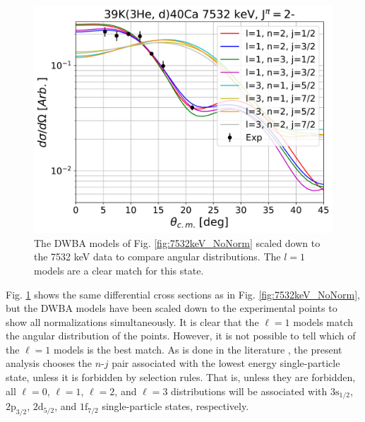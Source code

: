 \begin{figure}[t]
\centering
\includegraphics[width=6.5in]{Chapter-6/figs/7532keV_Norm.png}
\caption{\label{fig:7532keV_Norm}The DWBA models of Fig. \ref{fig:7532keV_NoNorm} scaled down to the 7532 keV data to compare angular distributions. The $l=1$ models are a clear match for this state.}
\end{figure}

Fig. \ref{fig:7532keV_Norm} shows the same differential cross sections as in Fig. \ref{fig:7532keV_NoNorm}, but the DWBA models have been scaled down to the experimental points to show all normalizations simultaneously. It is clear that the $\ell=1$ models match the angular distribution of the points. However, it is not possible to tell which of the $\ell=1$ models is the best match. As is done in the literature \cite{Erskine1966,Seth1967,Forster1970,Cage1971,Fuchs1969}, the present analysis chooses the $n$-$j$ pair associated with the lowest energy single-particle state, unless it is forbidden by selection rules. That is, unless they are forbidden, all $\ell=0$, $\ell=1$, $\ell=2$, and $\ell=3$ distributions will be associated with $3\mathrm{s}_{1/2}$, $2\mathrm{p}_{3/2}$, $2\mathrm{d}_{5/2}$, and $1\mathrm{f}_{7/2}$ single-particle states, respectively.

